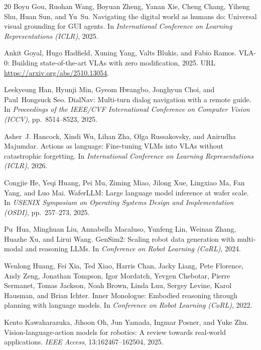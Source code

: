 \documentclass{article}
\begin{document}
\begin{thebibliography}{20}
Boyu Gou, Ruohan Wang, Boyuan Zheng, Yanan Xie, Cheng Chang, Yiheng Shu, Huan Sun, and Yu~Su.
\newblock Navigating the digital world as humans do: Universal visual grounding for GUI agents.
\newblock In \emph{International Conference on Learning Representations (ICLR)}, 2025.

Ankit Goyal, Hugo Hadfield, Xuning Yang, Valts Blukis, and Fabio Ramos.
\newblock VLA-0: Building state-of-the-art VLAs with zero modification, 2025.
\newblock URL \url{https://arxiv.org/abs/2510.13054}.

Leekyeung Han, Hyunji Min, Gyeom Hwangbo, Jonghyun Choi, and Paul~Hongsuck Seo.
\newblock DialNav: Multi-turn dialog navigation with a remote guide.
\newblock In \emph{Proceedings of the IEEE/CVF International Conference on Computer Vision (ICCV)}, pp.\ 8514--8523, 2025.

Asher~J. Hancock, Xindi Wu, Lihan Zha, Olga Russakovsky, and Anirudha Majumdar.
\newblock Actions as language: Fine-tuning VLMs into VLAs without catastrophic forgetting.
\newblock In \emph{International Conference on Learning Representations (ICLR)}, 2026.

Congjie He, Yeqi Huang, Pei Mu, Ziming Miao, Jilong Xue, Lingxiao Ma, Fan Yang, and Luo Mai.
\newblock WaferLLM: Large language model inference at wafer scale.
\newblock In \emph{USENIX Symposium on Operating Systems Design and Implementation (OSDI)}, pp.\ 257--273, 2025.

Pu~Hua, Minghuan Liu, Annabella Macaluso, Yunfeng Lin, Weinan Zhang, Huazhe Xu, and Lirui Wang.
\newblock GenSim2: Scaling robot data generation with multi-modal and reasoning LLMs.
\newblock In \emph{Conference on Robot Learning (CoRL)}, 2024.

Wenlong Huang, Fei Xia, Ted Xiao, Harris Chan, Jacky Liang, Pete Florence, Andy Zeng, Jonathan Tompson, Igor Mordatch, Yevgen Chebotar, Pierre Sermanet, Tomas Jackson, Noah Brown, Linda Luu, Sergey Levine, Karol Hausman, and Brian Ichter.
\newblock Inner Monologue: Embodied reasoning through planning with language models.
\newblock In \emph{Conference on Robot Learning (CoRL)}, 2022.

Kento Kawaharazuka, Jihoon Oh, Jun Yamada, Ingmar Posner, and Yuke Zhu.
\newblock Vision-language-action models for robotics: A review towards real-world applications.
\newblock \emph{IEEE Access}, 13:162467--162504, 2025.


\end{thebibliography}
\end{document}
